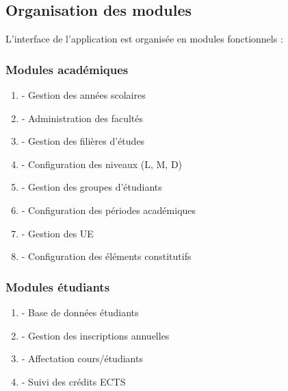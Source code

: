 
\subsection{Organisation des modules}

L'interface de l'application est organisée en modules fonctionnels :

\subsubsection{Modules académiques}

\begin{enumerate}[leftmargin=*]
    \item {} - Gestion des années scolaires
    \item {} - Administration des facultés
    \item {} - Gestion des filières d'études
    \item {} - Configuration des niveaux (L, M, D)
    \item {} - Gestion des groupes d'étudiants
    \item {} - Configuration des périodes académiques
    \item {} - Gestion des UE
    \item {} - Configuration des éléments constitutifs
\end{enumerate}

\subsubsection{Modules étudiants}

\begin{enumerate}[leftmargin=*]
    \item {} - Base de données étudiants
    \item {} - Gestion des inscriptions annuelles
    \item {} - Affectation cours/étudiants
    \item {} - Suivi des crédits ECTS
\end{enumerate}

